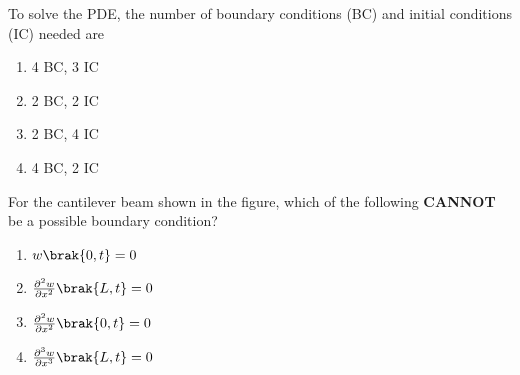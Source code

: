 \item To solve the PDE, the number of boundary conditions (BC) and initial conditions (IC) needed are
\begin{multicols}{2}
    \begin{enumerate}
        \item 4 BC, 3 IC
        \item 2 BC, 2 IC
        \item 2 BC, 4 IC
        \item 4 BC, 2 IC
    \end{enumerate}
\end{multicols}
\item For the cantilever beam shown in the figure, which of the following \textbf{CANNOT} be a possible boundary condition?
\begin{multicols}{2}
    \begin{enumerate}
        \item $w\brak{0,t} = 0$
        \item $\frac{\partial^2 w}{\partial x^2} \brak{L,t} = 0$
        \item $\frac{\partial^2 w}{\partial x^2} \brak{0,t} = 0$
        \item $\frac{\partial^3 w}{\partial x^3} \brak{L,t} = 0$
    \end{enumerate}
\end{multicols}


